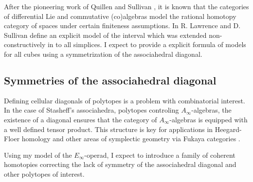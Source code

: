 After the pioneering work of Quillen \cite{quillen1969rational} and Sullivan \cite{sullivan1977infinitesimal}, it is known that the categories of differential Lie and commutative (co)algebras model the rational homotopy category of spaces under certain finiteness assumptions.
In \cite{lawrence2014interval} R. Lawrence and D. Sullivan define an explicit model of the interval which was extended non-constructively in \cite{buijs2020liemodels} to all simplices.
I expect to provide a explicit formula of models for all cubes using a symmetrization of the associahedral diagonal.

\subsection{Symmetries of the associahedral diagonal}

Defining cellular diagonals of polytopes is a problem with combinatorial interest.
In the case of Stasheff's associahedra, polytopes controling $A_\infty$-algebras,
the existence of a diagonal ensures that the category of $A_\infty$-algebras is equipped with a well defined tensor product.
This structure is key for applications in Heegard-Floer homology and other areas of symplectic geometry via Fukaya categories \cite{lipshitz2020diagonals}.

Using my model of the $E_\infty$-operad, I expect to introduce a family of coherent homotopies correcting the lack of symmetry of the associahedral diagonal and other polytopes of interest.
